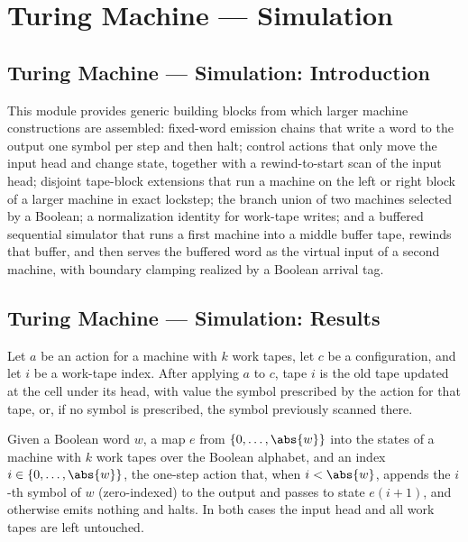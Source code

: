 \section{Turing Machine --- Simulation}
\subsection*{Turing Machine --- Simulation: Introduction}

This module provides generic building blocks from which larger machine
constructions are assembled: fixed-word emission chains that write a word to
the output one symbol per step and then halt; control actions that only move
the input head and change state, together with a rewind-to-start scan of the
input head; disjoint tape-block extensions that run a machine on the left or
right block of a larger machine in exact lockstep; the branch union of two
machines selected by a Boolean; a normalization identity for work-tape writes;
and a buffered sequential simulator that runs a first machine into a middle
buffer tape, rewinds that buffer, and then serves the buffered word as the
virtual input of a second machine, with boundary clamping realized by a
Boolean arrival tag.

\subsection*{Turing Machine --- Simulation: Results}

\begin{lemma}
\label{Turing.Action.apply_workTapes}
\leanok
{}
Let $a$ be an action for a machine with $k$ work tapes, let $c$ be a configuration, and
let $i$ be a work-tape index. After applying $a$ to $c$, tape $i$ is the old tape
updated at the cell under its head, with value the symbol prescribed by the action for
that tape, or, if no symbol is prescribed, the symbol previously scanned there.
\end{lemma}

\begin{definition}
\label{Turing.FinTM.emitAction}
\leanok
{}
Given a Boolean word $w$, a map $e$ from $\{0,\dots,\abs{w}\}$ into the states
of a machine with $k$ work tapes over the Boolean alphabet, and an index
$i \in \{0,\dots,\abs{w}\}$, the one-step action that, when $i < \abs{w}$,
appends the $i$-th symbol of $w$ (zero-indexed) to the output and passes to
state $e(i+1)$, and otherwise emits nothing and halts.  In both cases the
input head and all work tapes are left untouched.
\end{definition}

